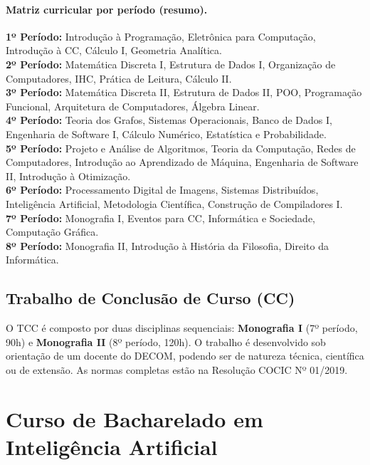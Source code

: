 \documentclass[9pt,a4paper]{extarticle}
\begin{document}
\paragraph{Matriz curricular por período (resumo).}
\vspace{0.3em}

\renewcommand{\arraystretch}{1.3}
\noindent\colorbox{shadeCC}{\parbox{\dimexpr\linewidth-2\fboxsep}{%
\textbf{1º Período:} Introdução à Programação, Eletrônica para Computação, Introdução à CC, Cálculo I, Geometria Analítica.\\
\textbf{2º Período:} Matemática Discreta I, Estrutura de Dados I, Organização de Computadores, IHC, Prática de Leitura, Cálculo II.\\
\textbf{3º Período:} Matemática Discreta II, Estrutura de Dados II, POO, Programação Funcional, Arquitetura de Computadores, Álgebra Linear.\\
\textbf{4º Período:} Teoria dos Grafos, Sistemas Operacionais, Banco de Dados I, Engenharia de Software I, Cálculo Numérico, Estatística e Probabilidade.\\
\textbf{5º Período:} Projeto e Análise de Algoritmos, Teoria da Computação, Redes de Computadores, Introdução ao Aprendizado de Máquina, Engenharia de Software II, Introdução à Otimização.\\
\textbf{6º Período:} Processamento Digital de Imagens, Sistemas Distribuídos, Inteligência Artificial, Metodologia Científica, Construção de Compiladores I.\\
\textbf{7º Período:} Monografia I, Eventos para CC, Informática e Sociedade, Computação Gráfica.\\
\textbf{8º Período:} Monografia II, Introdução à História da Filosofia, Direito da Informática.
}}

\subsection{Trabalho de Conclusão de Curso (CC)}

O TCC é composto por duas disciplinas sequenciais: \textbf{Monografia I} (7º período, 90h) e \textbf{Monografia II} (8º período, 120h). O trabalho é desenvolvido sob orientação de um docente do DECOM, podendo ser de natureza técnica, científica ou de extensão. As normas completas estão na Resolução COCIC Nº 01/2019.

\section{Curso de Bacharelado em Inteligência Artificial}
\end{document}
